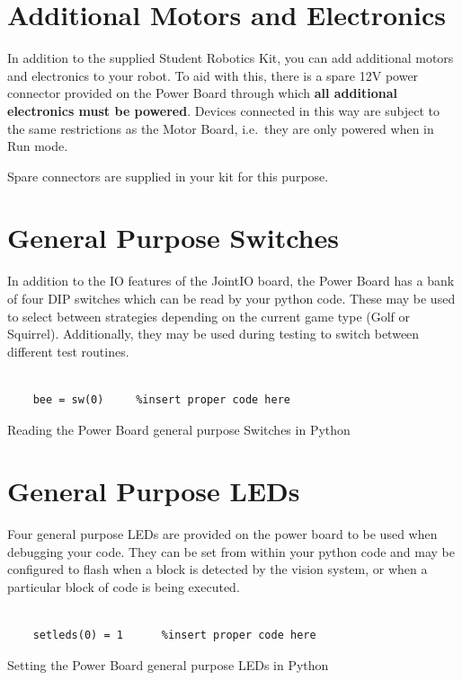 \documentclass[a4paper, 12pt]{article}
\begin{document}
\section{Additional Motors and Electronics}

In addition to the supplied Student Robotics Kit, you can add additional motors and electronics to your robot. To aid with this, there is a spare 12V power connector provided on the Power Board through which \textbf{all additional electronics must be powered}. Devices connected in this way are subject to the same restrictions as the Motor Board, i.e.\ they are only powered when in Run mode.

\vspace{12pt}

Spare connectors are supplied in your kit for this purpose.


\section{General Purpose Switches}

In addition to the IO features of the JointIO board, the Power Board has a bank of four DIP switches which can be read by your python code. These may be used to select between strategies depending on the current game type (Golf or Squirrel). Additionally, they may be used during testing to switch between different test routines. 

\begin{python}
\begin{verbatim}

	bee = sw(0)		%insert proper code here 

\end{verbatim}
  \caption{Reading the Power Board general purpose Switches in Python} 
\end{python}

\section{General Purpose LEDs}
Four general purpose LEDs are provided on the power board to be used when debugging your code. They can be set from within your python code and may be configured to flash when a block is detected by the vision system, or when a particular block of code is being executed.

\begin{python}
\begin{verbatim}

	setleds(0) = 1		%insert proper code here 

\end{verbatim}
  \caption{Setting the Power Board general purpose LEDs in Python} 
\end{python}
\end{document}
